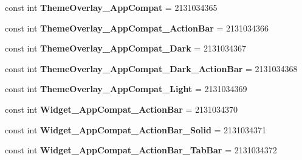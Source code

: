 \begin{DoxyCompactItemize}
\item 
\hypertarget{classClient_1_1Droid_1_1Resource_1_1Style_a2de9167bce72074898298271f953cfae}{}const int {\bfseries Theme\+Overlay\+\_\+\+App\+Compat} = 2131034365\label{classClient_1_1Droid_1_1Resource_1_1Style_a2de9167bce72074898298271f953cfae}

\item 
\hypertarget{classClient_1_1Droid_1_1Resource_1_1Style_a8e90566f0c00beb1f59bfa47e2893c3f}{}const int {\bfseries Theme\+Overlay\+\_\+\+App\+Compat\+\_\+\+Action\+Bar} = 2131034366\label{classClient_1_1Droid_1_1Resource_1_1Style_a8e90566f0c00beb1f59bfa47e2893c3f}

\item 
\hypertarget{classClient_1_1Droid_1_1Resource_1_1Style_a3331e33cf91c70e434cd39a3c3f642b4}{}const int {\bfseries Theme\+Overlay\+\_\+\+App\+Compat\+\_\+\+Dark} = 2131034367\label{classClient_1_1Droid_1_1Resource_1_1Style_a3331e33cf91c70e434cd39a3c3f642b4}

\item 
\hypertarget{classClient_1_1Droid_1_1Resource_1_1Style_af1a0e7d38bf097da466a22f2b133c821}{}const int {\bfseries Theme\+Overlay\+\_\+\+App\+Compat\+\_\+\+Dark\+\_\+\+Action\+Bar} = 2131034368\label{classClient_1_1Droid_1_1Resource_1_1Style_af1a0e7d38bf097da466a22f2b133c821}

\item 
\hypertarget{classClient_1_1Droid_1_1Resource_1_1Style_afe37a2cc4102a54bab7885d8738c9ded}{}const int {\bfseries Theme\+Overlay\+\_\+\+App\+Compat\+\_\+\+Light} = 2131034369\label{classClient_1_1Droid_1_1Resource_1_1Style_afe37a2cc4102a54bab7885d8738c9ded}

\item 
\hypertarget{classClient_1_1Droid_1_1Resource_1_1Style_a8b80505ab20500d2dd11412b058b6326}{}const int {\bfseries Widget\+\_\+\+App\+Compat\+\_\+\+Action\+Bar} = 2131034370\label{classClient_1_1Droid_1_1Resource_1_1Style_a8b80505ab20500d2dd11412b058b6326}

\item 
\hypertarget{classClient_1_1Droid_1_1Resource_1_1Style_a6aea7795b5e92065db1c518892317d4d}{}const int {\bfseries Widget\+\_\+\+App\+Compat\+\_\+\+Action\+Bar\+\_\+\+Solid} = 2131034371\label{classClient_1_1Droid_1_1Resource_1_1Style_a6aea7795b5e92065db1c518892317d4d}

\item 
\hypertarget{classClient_1_1Droid_1_1Resource_1_1Style_ad8ad2a3f14d5c0fd7361c55b3c8938ac}{}const int {\bfseries Widget\+\_\+\+App\+Compat\+\_\+\+Action\+Bar\+\_\+\+Tab\+Bar} = 2131034372\label{classClient_1_1Droid_1_1Resource_1_1Style_ad8ad2a3f14d5c0fd7361c55b3c8938ac}


\end{DoxyCompactItemize}
